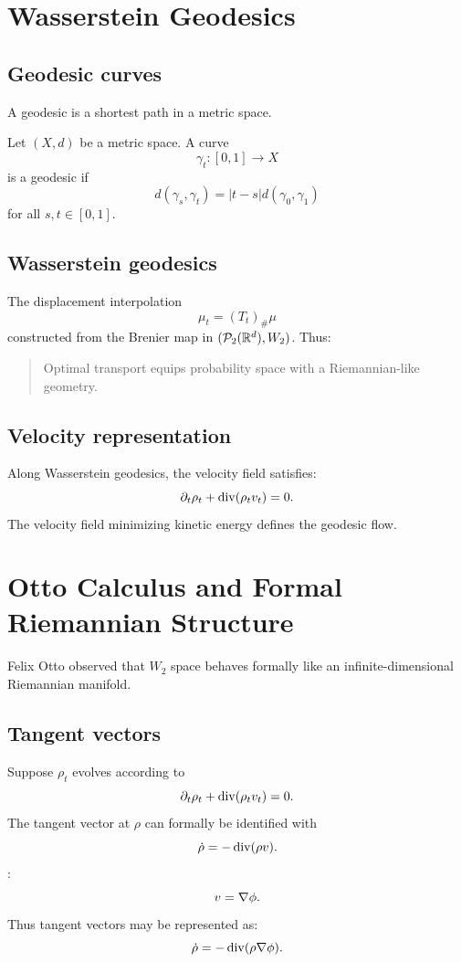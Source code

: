 \section{Wasserstein Geodesics}
\subsection{Geodesic curves}
A geodesic is a shortest path in a metric space.
\begin{definition}
Let $(X,d)$ be a metric space.
A curve
\[
\gamma_t : [0,1]\to X
\]
is a geodesic if
\[
d(\gamma_s,\gamma_t)
=
|t-s|d(\gamma_0,\gamma_1)
\]
for all $s,t\in[0,1]$.
\end{definition}
\subsection{Wasserstein geodesics}
The displacement interpolation
\[
\mu_t=(T_t)_{\#}\mu
\]
constructed from the Brenier map  in $(\mathcal{P}_2(\mathbb{R}^d),W_2)$.
Thus:
\begin{quote}
Optimal transport equips probability space with a Riemannian-like geometry.
\end{quote}
\subsection{Velocity representation}
Along Wasserstein geodesics, the velocity field satisfies:
\[
\partial_t \rho_t
+
\operatorname{div}(\rho_t v_t)=0.
\]
The velocity field minimizing kinetic energy defines the geodesic flow.
\section{Otto Calculus and Formal Riemannian Structure}
Felix Otto observed that $W_2$ space behaves formally like an infinite-dimensional Riemannian manifold.
\subsection{Tangent vectors}
Suppose $\rho_t$ evolves according to
\[
\partial_t \rho_t
+
\operatorname{div}(\rho_t v_t)=0.
\]
The tangent vector at $\rho$ can formally be identified with
\[
\dot \rho
=
-\operatorname{div}(\rho v).
\]
:
\[
v = \nabla \phi.
\]
Thus tangent vectors may be represented as:
\[
\dot \rho
=
-\operatorname{div}(\rho \nabla \phi).
\]
